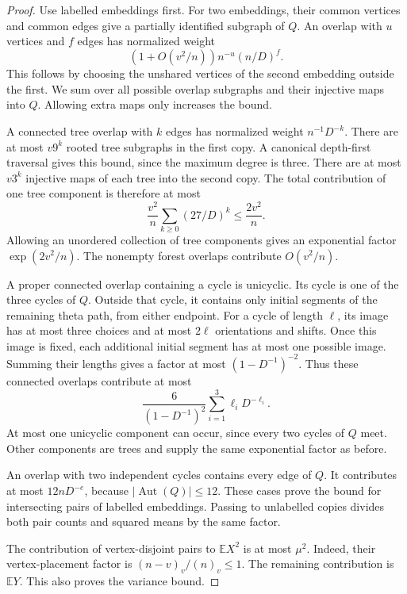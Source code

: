 \begin{proof}
Use labelled embeddings first.
For two embeddings, their common vertices and common edges give a partially identified subgraph of $Q$.
An overlap with $u$ vertices and $f$ edges has normalized weight
\[
 (1+O(v^2/n))n^{-u}(n/D)^f.
\]
This follows by choosing the unshared vertices of the second embedding outside the first.
We sum over all possible overlap subgraphs and their injective maps into $Q$.
Allowing extra maps only increases the bound.

A connected tree overlap with $k$ edges has normalized weight $n^{-1}D^{-k}$.
There are at most $v9^k$ rooted tree subgraphs in the first copy.
A canonical depth-first traversal gives this bound, since the maximum degree is three.
There are at most $v3^k$ injective maps of each tree into the second copy.
The total contribution of one tree component is therefore at most
\[
 \frac{v^2}{n}\sum_{k\ge0}(27/D)^k\le\frac{2v^2}{n}.
\]
Allowing an unordered collection of tree components gives an exponential factor
$\exp(2v^2/n)$.
The nonempty forest overlaps contribute $O(v^2/n)$.

A proper connected overlap containing a cycle is unicyclic.
Its cycle is one of the three cycles of $Q$.
Outside that cycle, it contains only initial segments of the remaining theta path, from either endpoint.
For a cycle of length $\ell$, its image has at most three choices and at most $2\ell$ orientations and shifts.
Once this image is fixed, each additional initial segment has at most one possible image.
Summing their lengths gives a factor at most $(1-D^{-1})^{-2}$.
Thus these connected overlaps contribute at most
\[
 \frac{6}{(1-D^{-1})^2}\sum_{i=1}^{3}\ell_iD^{-\ell_i}.
\]
At most one unicyclic component can occur, since every two cycles of $Q$ meet.
Other components are trees and supply the same exponential factor as before.

An overlap with two independent cycles contains every edge of $Q$.
It contributes at most $12nD^{-e}$, because $|\operatorname{Aut}(Q)|\le12$.
These cases prove the bound for intersecting pairs of labelled embeddings.
Passing to unlabelled copies divides both pair counts and squared means by the same factor.

The contribution of vertex-disjoint pairs to $\mathbb E X^2$ is at most $\mu^2$.
Indeed, their vertex-placement factor is $(n-v)_v/(n)_v\le1$.
The remaining contribution is $\mathbb E Y$.
This also proves the variance bound.
\end{proof}

